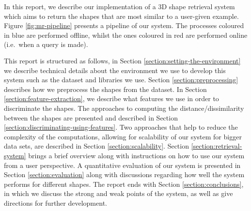 In this report, we describe our implementation of a 3D shape retrieval system which aims to return the shapes that are most similar to a user-given example.
Figure \ref{fig:mr-pipeline} presents a pipeline of our system.
The processes coloured in blue are performed offline, whilst the ones coloured in red are performed online (i.e.\ when a query is made).

This report is structured as follows, in Section \ref{section:setting-the-environment} we describe technical details about the environment we use to develop this system such as the dataset and libraries we use.
Section \ref{section:preprocessing} describes how we preprocess the shapes from the dataset.
In Section \ref{section:feature-extraction}, we describe what features we use in order to discriminate the shapes.
The approaches to computing the distance/dissimilarity between the shapes are presented and described in Section \ref{section:discriminating-using-features}.
Two approaches that help to reduce the complexity of the computations, allowing for scalability of our system for bigger data sets, are described in Section \ref{section:scalability}.
Section \ref{section:retrieval-system} brings a brief overview along with instructions on how to use our system from a user perspective.
A quantitative evaluation of our system is presented in Section \ref{section:evaluation} along with discussions regarding how well the system performs for different shapes.
The report ends with Section \ref{section:conclusions}, in which we discuss the strong and weak points of the system, as well as give directions for further development.